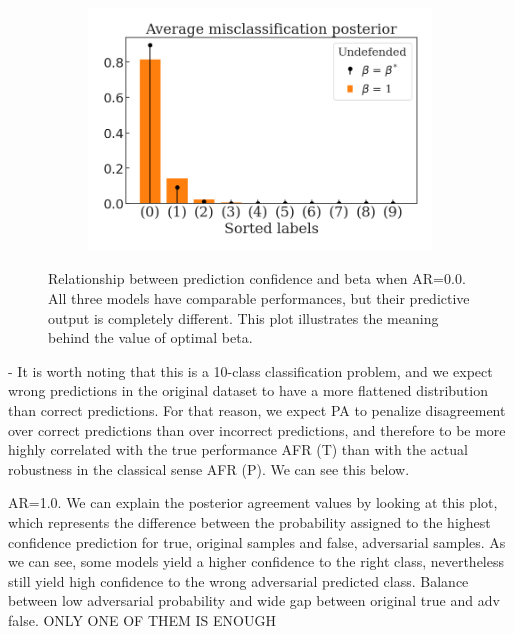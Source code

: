 \begin{figure}[H]
\begin{subfigure}[b]{0.3\textwidth}
        \includegraphics[width=\textwidth]{img/results_discussion/adversarial/PGD_0.0314_probability_misclass_standard.png}
    \end{subfigure}
    \caption{Relationship between prediction confidence and beta when AR=0.0. All three models have comparable performances, but their predictive output is completely different. This plot illustrates the meaning behind the value of optimal beta.}
\end{figure}

- It is worth noting that this is a 10-class classification problem, and we expect wrong predictions in the original dataset to have a more flattened distribution than correct predictions. For that reason, we expect PA to penalize disagreement over correct predictions than over incorrect predictions, and therefore to be more highly correlated with the true performance AFR (T) than with the actual robustness in the classical sense AFR (P). We can see this below.



AR=1.0. We can explain the posterior agreement values by looking at this plot, which represents the difference between the probability assigned to the highest confidence prediction for true, original samples and false, adversarial samples. As we can see, some models yield a higher confidence to the right class, nevertheless still yield high confidence to the wrong adversarial predicted class. Balance between low adversarial probability and wide gap between original true and adv false. ONLY ONE OF THEM IS ENOUGH

